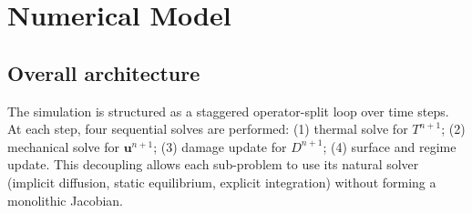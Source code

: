 \documentclass[12pt, a4paper]{article}
\newcommand{\vv}[1]{\bm{#1}}
\begin{document}
\section{Numerical Model}
\label{sec:numerics}

\subsection{Overall architecture}

The simulation is structured as a staggered operator-split loop over time steps.
At each step, four sequential solves are performed:
(1) thermal solve for $T^{n+1}$; (2) mechanical solve for $\vv{u}^{n+1}$;
(3) damage update for $D^{n+1}$; (4) surface and regime update.
This decoupling allows each sub-problem to use its natural solver (implicit
diffusion, static equilibrium, explicit integration) without forming a
monolithic Jacobian.
\end{document}
